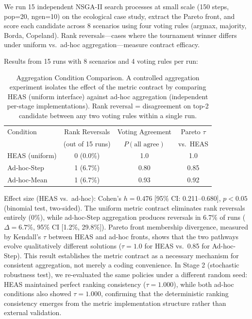 \documentclass{wscpaperproc}
\begin{document}
We run 15 independent NSGA-II search processes at small scale (150 steps, pop=20,
ngen=10) on the ecological case study, extract the Pareto front, and score each
candidate across 8 scenarios using four voting rules (argmax, majority, Borda,
Copeland). Rank reversals---cases where the tournament winner differs under uniform
vs.\ ad-hoc aggregation---measure contract efficacy.

Results from 15 runs with 8 scenarios and 4 voting rules per run:

\begin{table}[ht]
\centering\small
\caption{Aggregation Condition Comparison. A controlled aggregation experiment isolates
the effect of the metric contract by comparing HEAS (uniform interface) against ad-hoc
aggregation (independent per-stage implementations). Rank reversal = disagreement on
top-2 candidate between any two voting rules within a single run.}
\label{tab:agg-control}
\begin{tabular}{lccc}
\toprule
Condition & Rank Reversals & Voting Agreement & Pareto $\tau$ \\
& (out of 15 runs) & $P(\text{all agree})$ & vs.\ HEAS \\
\midrule
HEAS (uniform) & 0 (0.0\%) & 1.0 & 1.0 \\
Ad-hoc-Step & 1 (6.7\%) & 0.80 & 0.85 \\
Ad-hoc-Mean & 1 (6.7\%) & 0.93 & 0.92 \\
\bottomrule
\end{tabular}
\end{table}

Effect size (HEAS vs.\ ad-hoc): Cohen's $h = 0.476$ [95\% CI: 0.211--0.680],
$p < 0.05$ (binomial test, two-sided). The uniform metric contract eliminates
rank reversals entirely (0\%), while ad-hoc-Step aggregation produces reversals in 6.7\%
of runs ($\Delta = 6.7\%$, 95\% CI [1.2\%, 29.8\%]). Pareto front membership divergence,
measured by Kendall's $\tau$ between HEAS and ad-hoc fronts, shows that the two
pathways evolve qualitatively different solutions ($\tau = 1.0$ for HEAS vs.\ 0.85 for
Ad-hoc-Step). This result establishes the metric contract as a necessary mechanism for consistent
aggregation, not merely a coding convenience. In Stage 2 (stochastic robustness test), we
re-evaluated the same policies under a different random seed: HEAS maintained perfect
ranking consistency ($\tau = 1.000$), while both ad-hoc conditions also showed $\tau = 1.000$,
confirming that the deterministic ranking consistency emerges from the metric implementation
structure rather than external validation.
\end{document}
